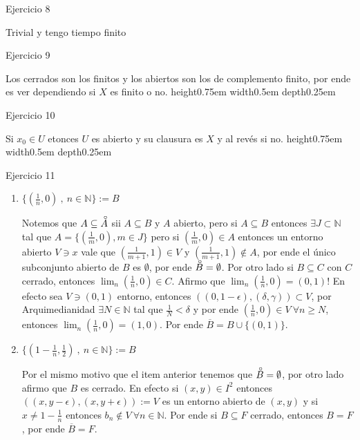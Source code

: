 \documentclass[11pt]{article}
\newcommand{\N}{{\mathbb{N}}}
\newcommand{\sett}[1]{\{#1\}}
\newcommand{\interior}[1]{\accentset{\smash{\raisebox{-0.12ex}{$\scriptstyle\circ$}}}{#1}\rule{0pt}{2.3ex}}
\newenvironment{proof}[1][Demostraci\'on]{\begin{trivlist}
\item[\hskip \labelsep {\bfseries #1}]}{\end{trivlist}}
\newcommand{\qed}{\nobreak \ifvmode \relax \else
      \ifdim\lastskip<1.5em \hskip-\lastskip
      \hskip1.5em plus0em minus0.5em \fi \nobreak
      \vrule height0.75em width0.5em depth0.25em\fi}
\begin{document}
\begin{enumerate}
\item{Ejercicio 8}

\begin{proof}
Trivial y tengo tiempo finito
\end{proof}

\item {Ejercicio 9}

\begin{proof}
Los cerrados son los finitos y los abiertos son los de complemento finito, por ende es ver dependiendo si $X$ es finito o no. \qed
\end{proof}

\item {Ejercicio 10}

\begin{proof}
Si $x_0 \in U$ etonces $U$ es abierto y su clausura es $X$ y al rev\'es si no. \qed
\end{proof}

\item {Ejercicio 11}
\begin{proof}

\begin{enumerate}

\item {$\sett{(\frac{1}{n},0) \ , \ n \in \N} := B$}

Notemos que $A \subseteq \interior{A} $ sii $A \subseteq B$ y $A$ abierto, pero si $A \subseteq B$ entonces $\exists J \subset \N$ tal que $A = \sett{(\frac{1}{m},0) , m \in J}$ pero si $(\frac{1}{m},0) \in A$ entonces un entorno abierto $V \ni x$ vale que $(\frac{1}{m+1},1) \in V$ y $(\frac{1}{m+1},1) \not \in A$, por ende el \'unico subconjunto abierto de $B$ es $\emptyset$, por ende $\interior{B}=\emptyset$.
Por otro lado si $B \subseteq C$ con $C$ cerrado, entonces $\lim_{n}{(\frac{1}{n},0)} \in C$. Afirmo que $\lim_{n}{(\frac{1}{n},0)} = (0,1)$! En efecto sea $V \ni (0,1)$ entorno, entonces $((0,1-\epsilon),(\delta,\gamma))\subset V$, por Arquimedianidad $\exists N \in \N$ tal que $\frac{1}{N} < \delta$ y por ende $(\frac{1}{n},0) \in V \ \forall n \geq N$, entonces $\lim_{n}{(\frac{1}{n},0)} = (1,0)$. Por ende $\overline{B} = B \cup \sett{(0,1)}$.

\item {$\sett{(1-\frac{1}{n},\frac{1}{2}) \ , \ n \in \N} := B$}

Por el mismo motivo que el item anterior tenemos que $\interior{B} = \emptyset$, por otro lado afirmo que $B$ es cerrado. En efecto si $(x,y) \in I^2$ entonces $((x,y-\epsilon),(x,y+\epsilon)):=V$ es un entorno abierto de $(x,y)$ y si $x \neq 1- \frac{1}{n}$ entonces $b_n \not \in V \ \forall n \in \N$. Por ende si $B \subseteq F$ cerrado, entonces $B = F$, por ende $\overline{B}=F$.


\end{enumerate}
\end{proof}
\end{enumerate}
\end{document}

